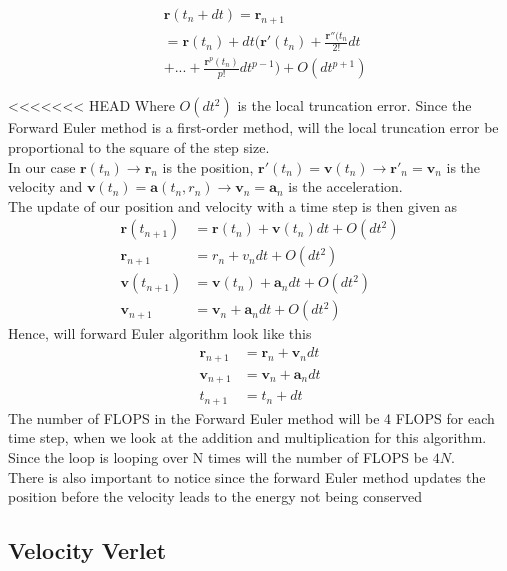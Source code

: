 \documentclass{article}
\begin{document}
\begin{multicols}{2}
\begin{equation}
\begin{split}
&\mathbf{r}(t_n+dt)=\mathbf{r}_{n+1}\\
&=\mathbf{r}(t_n)+dt\bigg(\mathbf{r}'(t_n) + \frac{\mathbf{r}''(t_n}{2!}dt\\
&+ ... + \frac{\mathbf{r}^p(t_n)}{p!}dt^{p-1}\bigg) + O(dt^{p+1})
\end{split}
\label{eq:ytndt}
\end{equation} 

<<<<<<< HEAD
Where $O(dt^2)$ is the local truncation error. Since the Forward Euler method is a first-order method, will the local truncation error be proportional to the square of the step size. \\
In our case $\mathbf{r}(t_n) \rightarrow \mathbf{r}_n$ is the position, $\mathbf{r}'(t_n)=\mathbf{v}(t_n) \rightarrow \mathbf{r}'_n=\mathbf{v}_n$ is the velocity and $\mathbf{v}(t_n)=\mathbf{a}(t_n,r_n) \rightarrow \mathbf{v}_n=\mathbf{a}_n$ is the acceleration.\\
The update of our position and velocity with a  time step is then given as  
\begin{align}
    \mathbf{r}(t_{n+1})&=\mathbf{r}(t_n) + \mathbf{v}(t_n)dt + O(dt^2)\\
    \mathbf{r}_{n+1}&=r_{n} + v_{n}dt + O(dt^2)\\
    \mathbf{v}(t_{n+1})&=\mathbf{v}(t_n)+\mathbf{a}_ndt + O(dt^2)\\
    \mathbf{v}_{n+1}&=\mathbf{v}_n +\mathbf{a}_n dt + O(dt^2)
\end{align}
Hence, will forward Euler algorithm look like this
\begin{align}
    \mathbf{r}_{n+1}&=\mathbf{r}_n+\mathbf{v}_ndt\\
    \mathbf{v}_{n+1}&=\mathbf{v}_n+\mathbf{a}_ndt\\
    t_{n+1}&=t_n + dt
\end{align}
The number of FLOPS in the Forward Euler method will be 4 FLOPS for each time step, when we look at the addition and multiplication for this algorithm. Since the loop is looping over N times will the number of FLOPS be $4N$. \\
There is also important to notice since the forward Euler method updates the position before the velocity leads to the energy not being conserved
\subsection{Velocity Verlet}


\end{multicols}
\end{document}
